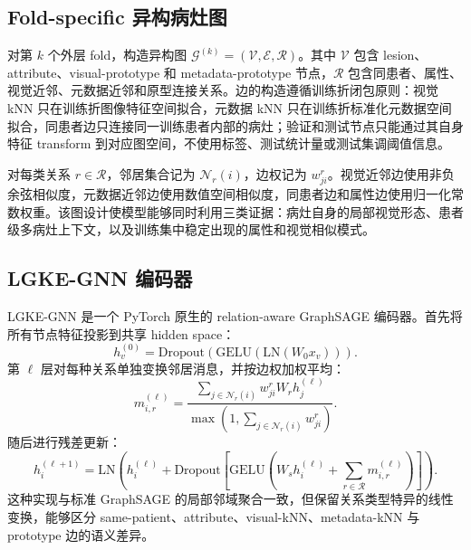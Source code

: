 \documentclass[UTF8,a4paper,10pt,twocolumn,fontset=fandol]{ctexart}
\newcommand{\modelname}{LGKE-GNN}
\begin{document}
\subsection{Fold-specific 异构病灶图}
对第 $k$ 个外层 fold，构造异构图 $\mathcal{G}^{(k)}=(\mathcal{V},\mathcal{E},\mathcal{R})$。其中 $\mathcal{V}$ 包含 lesion、attribute、visual-prototype 和 metadata-prototype 节点，$\mathcal{R}$ 包含同患者、属性、视觉近邻、元数据近邻和原型连接关系。边的构造遵循训练折闭包原则：视觉 kNN 只在训练折图像特征空间拟合，元数据 kNN 只在训练折标准化元数据空间拟合，同患者边只连接同一训练患者内部的病灶；验证和测试节点只能通过其自身特征 transform 到对应图空间，不使用标签、测试统计量或测试集调阈值信息。

对每类关系 $r\in\mathcal{R}$，邻居集合记为 $\mathcal{N}_r(i)$，边权记为 $w_{ji}^{r}$。视觉近邻边使用非负余弦相似度，元数据近邻边使用数值空间相似度，同患者边和属性边使用归一化常数权重。该图设计使模型能够同时利用三类证据：病灶自身的局部视觉形态、患者级多病灶上下文，以及训练集中稳定出现的属性和视觉相似模式。

\subsection{\modelname{} 编码器}
\modelname{} 是一个 PyTorch 原生的 relation-aware GraphSAGE 编码器。首先将所有节点特征投影到共享 hidden space：
\begin{equation}
    h_v^{(0)}=\mathrm{Dropout}\left(\mathrm{GELU}\left(\mathrm{LN}(W_0x_v)\right)\right).
\end{equation}
第 $\ell$ 层对每种关系单独变换邻居消息，并按边权加权平均：
\begin{equation}
    m_{i,r}^{(\ell)}
    =
    \frac{\sum_{j\in\mathcal{N}_r(i)} w_{ji}^{r} W_r h_j^{(\ell)}}
    {\max\left(1,\sum_{j\in\mathcal{N}_r(i)} w_{ji}^{r}\right)}.
\end{equation}
随后进行残差更新：
\begin{equation}
    h_i^{(\ell+1)}
    =
    \mathrm{LN}\left(
    h_i^{(\ell)}
    +
    \mathrm{Dropout}\left[
    \mathrm{GELU}\left(W_s h_i^{(\ell)}+\sum_{r\in\mathcal{R}}m_{i,r}^{(\ell)}\right)
    \right]\right).
\end{equation}
这种实现与标准 GraphSAGE 的局部邻域聚合一致，但保留关系类型特异的线性变换，能够区分 same-patient、attribute、visual-kNN、metadata-kNN 与 prototype 边的语义差异。
\end{document}
